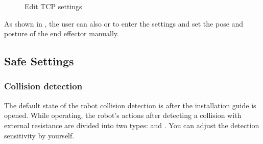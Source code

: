\begin{figure}[htb]
\begin{minipage}[t]{0.48\linewidth}
		\caption{Edit TCP settings}
		\label{fig:编辑TCP设置}
	\end{minipage}
\end{figure}

As shown in , the user can also  or  to enter the  settings and set the pose and posture of the end effector manually.


\subsection{Safe Settings}
\subsubsection{Collision detection}
The default state of the robot collision detection is  after the installation guide is opened. While operating, the robot's actions after detecting a collision with external resistance are divided into two types:  and . You can adjust the detection sensitivity by yourself.

